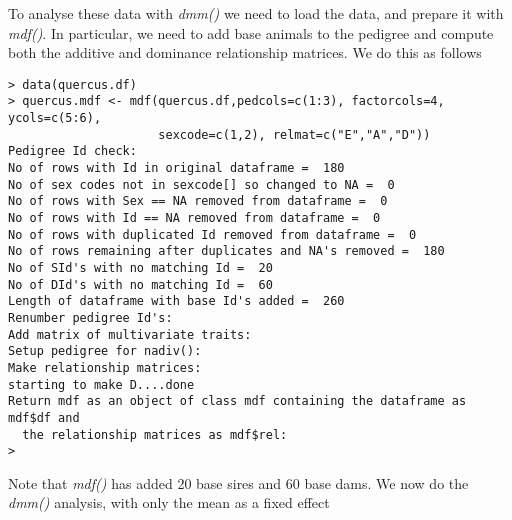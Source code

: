 \documentclass[titlepage]{article}  %
\begin{document}
To analyse these data with {\em dmm()} we need to load the data, and prepare it with {\em mdf()}. In particular, we need to add base animals to the pedigree and compute both the additive and dominance relationship matrices. We do this as follows

\begin{verbatim}
> data(quercus.df)
> quercus.mdf <- mdf(quercus.df,pedcols=c(1:3), factorcols=4, ycols=c(5:6),
                     sexcode=c(1,2), relmat=c("E","A","D"))
Pedigree Id check:
No of rows with Id in original dataframe =  180 
No of sex codes not in sexcode[] so changed to NA =  0 
No of rows with Sex == NA removed from dataframe =  0 
No of rows with Id == NA removed from dataframe =  0 
No of rows with duplicated Id removed from dataframe =  0 
No of rows remaining after duplicates and NA's removed =  180 
No of SId's with no matching Id =  20 
No of DId's with no matching Id =  60 
Length of dataframe with base Id's added =  260 
Renumber pedigree Id's:
Add matrix of multivariate traits:
Setup pedigree for nadiv():
Make relationship matrices:
starting to make D....done 
Return mdf as an object of class mdf containing the dataframe as mdf$df and
  the relationship matrices as mdf$rel:
> 
\end{verbatim}

Note that {\em mdf()} has added 20 base sires and 60 base dams. We now do the {\em dmm()} analysis, with only the mean as a fixed effect
\end{document}
